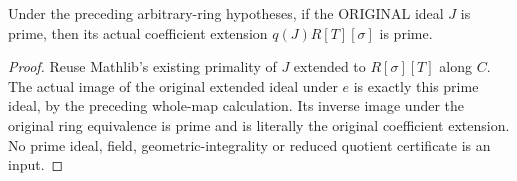 \begin{lemma}
\label{lem:actual-polynomial-coefficient-prime-extension}
\leanok
{}
Under the preceding arbitrary-ring hypotheses, if the ORIGINAL ideal $J$
is prime, then its actual coefficient extension $q(J)R[T][\sigma]$ is prime.
\end{lemma}
\begin{proof}
Reuse Mathlib's existing primality of $J$ extended to $R[\sigma][T]$
along $C$. The actual image of the original extended ideal under $e$
is exactly this prime ideal, by the preceding whole-map calculation.
Its inverse image under the original ring equivalence is prime and is
literally the original coefficient extension. No prime ideal, field,
geometric-integrality or reduced quotient certificate is an input.
\end{proof}

